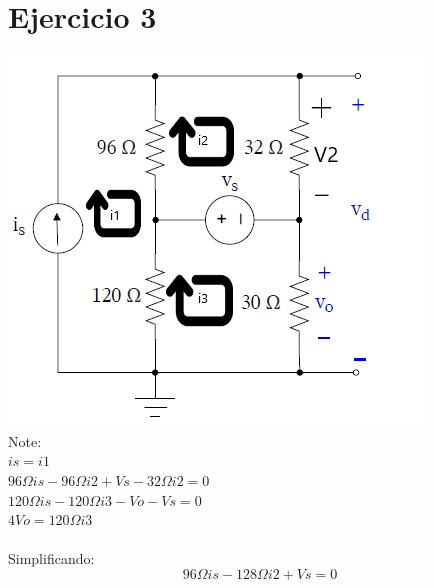\documentclass{article}
\begin{document}
\section{Ejercicio 3}
\includegraphics[]{images/ejercicio2.PNG} \\
Note: \\ 
$is = i1$ \\
${96\Omega}is - {96\Omega}i2 + Vs - {32\Omega}i2 = 0$  \\
${120\Omega}is - {120\Omega}i3 - Vo - Vs = 0$ \\
$4Vo = {120\Omega}i3$ \\ \\ 
Simplificando: \\

\begin{equation} 
    {96\Omega}is - {128\Omega}i2 + Vs = 0
\end{equation}
\end{document}
